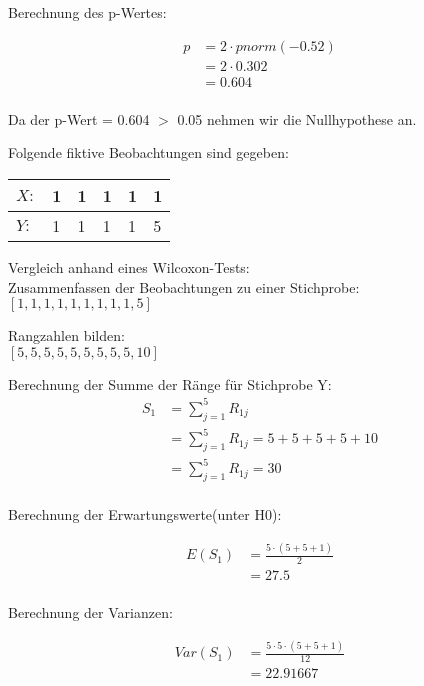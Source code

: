\documentclass[a4paper,12pt]{article}
\begin{document}
Berechnung des p-Wertes:

\begin{align*}
p
&= 2 \cdot pnorm(-0.52) \\
&= 2 \cdot 0.302  \\
&= 0.604 \\
\end{align*}

Da der p-Wert = 0.604 $>$ 0.05 nehmen wir die Nullhypothese an.

Folgende fiktive Beobachtungen sind gegeben:\\

\begin{tabular}{ | l | l | l | l | l | p{0.5cm} |}
	\hline
	$X:$ & 1 & 1 & 1 & 1 & 1 \\ \hline
	$Y:$ & 1 & 1 & 1 & 1 & 5 \\ \hline
\end{tabular}

Vergleich anhand eines Wilcoxon-Tests:\\

Zusammenfassen der Beobachtungen zu einer Stichprobe: \\

$[1,1,1,1,1,1,1,1,1,5]$

Rangzahlen bilden: \\

$[5,5,5,5,5,5,5,5,5,10]$


Berechnung der Summe der Ränge für Stichprobe Y:
\begin{align*}
S_1 
&= \sum_{j=1}^{5} R_{1j} \\
&= \sum_{j=1}^{5} R_{1j} = 5+5+5+5+10 \\
&= \sum_{j=1}^{5} R_{1j} = 30	\\
\end{align*}

Berechnung der Erwartungswerte(unter H0):

\begin{align*}
E(S_1)
&= \frac{5\cdot(5+5+1)}{2} \\
&= 27.5 \\
\end{align*}


Berechnung der Varianzen:

\begin{align*}
Var(S_1)
&= \frac{5\cdot 5 \cdot (5+5+1)}{12} \\
&=  22.91667 \\
\end{align*}
\end{document}

